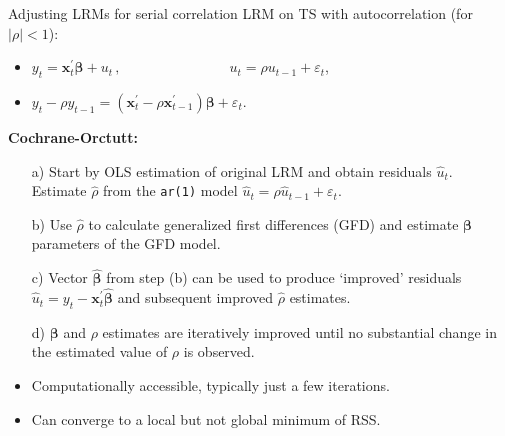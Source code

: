 \documentclass{beamer}
\begin{document}
\begin{frame}{Adjusting LRMs for serial correlation}
LRM on TS with autocorrelation (for $|\rho|<1$):\\ \medskip
\begin{itemize}
    \item $y_t=\bm{x}_t^{\prime} \bm{\beta} + u_t \,,\qquad \qquad \qquad~~~~~~~\, u_t = \rho u_{t-1}+\varepsilon_t$,
    \item $y_t - \rho y_{t-1} =  ( \bm{x}_t^{\prime} - \rho \bm{x}_{t-1}^{\prime}) \bm{\beta} + \varepsilon_t$.
\end{itemize}
\medskip
\textbf{Cochrane-Orctutt:} \\ \medskip
\begin{itemize}
    \item[a)] Start by OLS estimation of original LRM and obtain residuals $\hat{u}_t$. Estimate $\hat{\rho}$ from the \texttt{ar(1)} model $\hat{u}_t = \rho \hat{u}_{t-1}+\varepsilon_t$. 
    \item[b)] Use $\hat{\rho}$ to calculate generalized first differences (GFD) and estimate $\bm{\beta}$ parameters of the GFD model.
    \item[c)] Vector $\hat{\bm{\beta}}$ from step (b) can be used to produce `improved' residuals $\hat{u}_t = y_t - \bm{x}_t^{\prime}\hat{\bm{\beta}}$ and subsequent improved $\hat{\rho}$ estimates. 
    \item[d)] $\bm{\beta}$ and $\rho$ estimates are iteratively improved until no substantial change in the estimated value of $\rho$ is observed.
    \medskip
    \item Computationally accessible, typically just a few iterations.
    \item Can converge to a local but not global minimum of RSS.
\end{itemize}
\end{frame}
\end{document}
